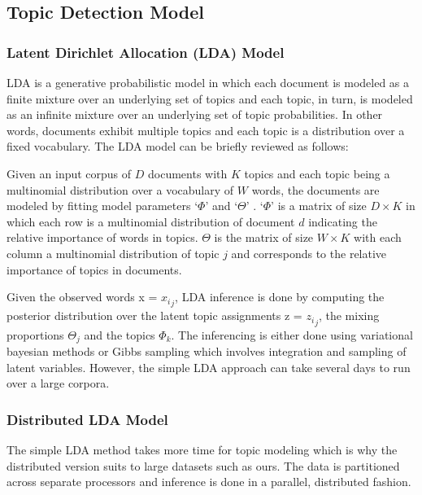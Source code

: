 \subsection{Topic Detection Model}


\subsubsection{Latent Dirichlet Allocation (LDA) Model}

LDA is a generative probabilistic model in which each document is modeled as a finite mixture over an underlying set of topics and each topic, in turn, is modeled as an infinite mixture over an underlying set of topic probabilities\cite{blei2003latent}. In other words, documents exhibit multiple topics and each topic is a distribution over a fixed vocabulary.
The LDA model can be briefly reviewed as follows:


Given an input corpus of $D$ documents with $K$ topics and each topic being a multinomial distribution over a vocabulary of  $W$ words, the documents are modeled by fitting model parameters `${\Phi}$' and `${\Theta}$' . `${\Phi}$' is a matrix of size $D \times K$ in which each row is a multinomial distribution of document $d$  indicating the relative importance of words in topics. ${\Theta}$ is the matrix of size $W \times K$ with each column a multinomial distribution of topic $j$ and corresponds to the relative importance of topics in documents.

Given the observed words x = ${x_i}_j$, LDA inference is done by computing the
posterior distribution over the latent topic assignments z = ${z_i}_j$, the mixing proportions ${\Theta_j}$  and the
topics ${\Phi_k}$.  The inferencing is either done using variational bayesian methods or Gibbs sampling which involves integration and sampling of latent variables.
However, the simple LDA approach can take several days to run over a large corpora.


\subsubsection{Distributed LDA Model}
 The simple LDA method takes more time for topic modeling which is why the distributed version suits to large datasets such as ours.
The data is partitioned across separate processors and inference is done in a parallel, distributed fashion. 

